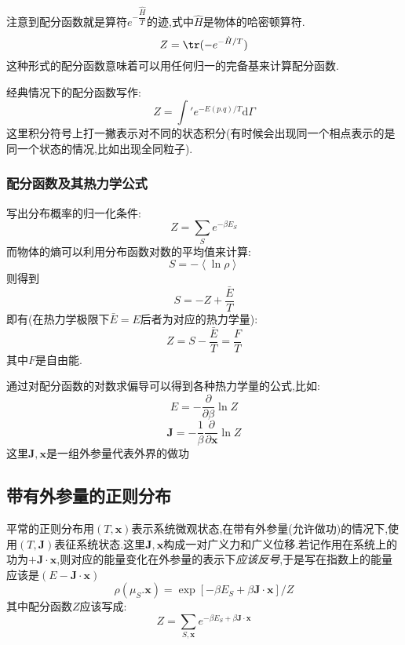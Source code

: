   注意到配分函数就是算符$e^{-\dfrac{\hat{H}}{T}}$的迹,式中$\hat{H}$是物体的哈密顿算符.
  \begin{equation}
    Z=\tr(-e^{- \hat{H} / T})
  \end{equation}
  这种形式的配分函数意味着可以用任何归一的完备基来计算配分函数.

  经典情况下的配分函数写作:
  \begin{equation}
    Z=\int' e^{-E(p.q) / T} \mathrm{d} \Gamma
  \end{equation}
  这里积分符号上打一撇表示对不同的状态积分(有时候会出现同一个相点表示的是同一个状态的情况,比如出现全同粒子).

\subsubsection{配分函数及其热力学公式}
  写出分布概率的归一化条件:
  \begin{equation}
    Z=\sum_S e^{-\beta E_S}
  \end{equation}
  而物体的熵可以利用分布函数对数的平均值来计算:
  \[S=-\left< \ln \rho \right> \]
  则得到
  \[S=-Z+\dfrac{\bar{E}}{T}\]
  即有(在热力学极限下$\bar{E}=E$后者为对应的热力学量):
  \begin{equation}
    Z=S-\dfrac{\bar{E}}{T}=\frac{F}{T}
  \end{equation}
  其中$F$是自由能.

  通过对配分函数的对数求偏导可以得到各种热力学量的公式,比如:
  \begin{equation}
    E=-\dfrac{\partial }{\partial \beta}\ln Z
  \end{equation}
  \begin{equation}
    \mathbf{J}=-\frac{1}{\beta}\dfrac{\partial }{\partial \mathbf{x}}\ln Z
  \end{equation}
  这里$\mathbf{J},\mathbf{x}$是一组外参量代表外界的做功

\subsection{带有外参量的正则分布}
  平常的正则分布用$(T,\mathbf{x})$表示系统微观状态,在带有外参量(允许做功)的情况下,使用$(T,\mathbf{J})$表征系统状态.这里$\mathbf{J},\mathbf{x}$构成一对广义力和广义位移.若记作用在系统上的功为$+\mathbf{J}\cdot \mathbf{x}$,则对应的能量变化在外参量的表示下\emph{应该反号},于是写在指数上的能量应该是$(E-\mathbf{J}\cdot \mathbf{x})$
  \[\rho(\mu_S.\mathbf{x})=\exp[-\beta E_S+\beta \mathbf{J}\cdot \mathbf{x}] / Z\]
  其中配分函数$Z$应该写成:
  \begin{equation}
    Z=\sum_{S,\mathbf{x}}e^{-\beta E_S+\beta \mathbf{J}\cdot \mathbf{x}}
  \end{equation}


